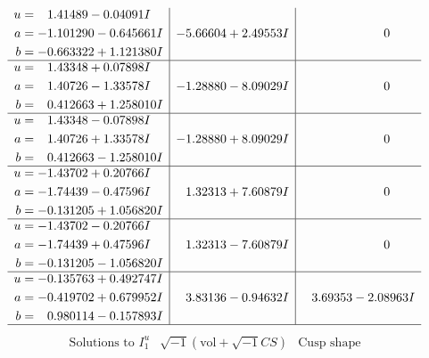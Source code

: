 \documentclass[1p]{elsarticle_modified}
\theoremstyle{definition}
\newcommand{\I}{\sqrt{-1}}
\begin{document}
$$\begin{array}{c|c|c}
\begin{aligned}
u &= \phantom{-}1.41489 - 0.04091 I \\
a &= -1.101290 - 0.645661 I \\
b &= -0.663322 + 1.121380 I\end{aligned}
 & -5.66604 + 2.49553 I & \phantom{-0.000000 } 0 \\ \hline\begin{aligned}
u &= \phantom{-}1.43348 + 0.07898 I \\
a &= \phantom{-}1.40726 - 1.33578 I \\
b &= \phantom{-}0.412663 + 1.258010 I\end{aligned}
 & -1.28880 - 8.09029 I & \phantom{-0.000000 } 0 \\ \hline\begin{aligned}
u &= \phantom{-}1.43348 - 0.07898 I \\
a &= \phantom{-}1.40726 + 1.33578 I \\
b &= \phantom{-}0.412663 - 1.258010 I\end{aligned}
 & -1.28880 + 8.09029 I & \phantom{-0.000000 } 0 \\ \hline\begin{aligned}
u &= -1.43702 + 0.20766 I \\
a &= -1.74439 - 0.47596 I \\
b &= -0.131205 + 1.056820 I\end{aligned}
 & \phantom{-}1.32313 + 7.60879 I & \phantom{-0.000000 } 0 \\ \hline\begin{aligned}
u &= -1.43702 - 0.20766 I \\
a &= -1.74439 + 0.47596 I \\
b &= -0.131205 - 1.056820 I\end{aligned}
 & \phantom{-}1.32313 - 7.60879 I & \phantom{-0.000000 } 0 \\ \hline\begin{aligned}
u &= -0.135763 + 0.492747 I \\
a &= -0.419702 + 0.679952 I \\
b &= \phantom{-}0.980114 - 0.157893 I\end{aligned}
 & \phantom{-}3.83136 - 0.94632 I & \phantom{-}3.69353 - 2.08963 I\\
 \hline 
 \end{array}$$\newpage$$\begin{array}{c|c|c}  
\text{Solutions to }I^u_{1}& \I (\text{vol} + \sqrt{-1}CS) & \text{Cusp shape}\\
 \hline 
\begin{aligned}

\end{aligned}
\end{array}$$
\end{document}
